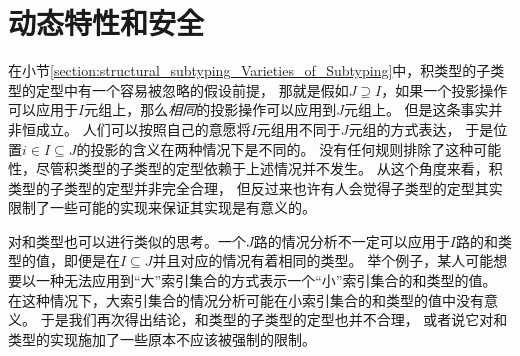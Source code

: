 \section{动态特性和安全}
在小节\ref{section:structural_subtyping_Varieties_of_Subtyping}中，积类型的子类型的定型中有一个容易被忽略的假设前提，
那就是假如$J\supseteq I$，如果一个投影操作可以应用于$I$元组上，那么\textit{相同}的投影操作可以应用到$J$元组上。
但是这条事实并非恒成立。
人们可以按照自己的意愿将$I$元组用不同于$J$元组的方式表达，
于是位置$i\in I \subseteq J$的投影的含义在两种情况下是不同的。
没有任何规则排除了这种可能性，尽管积类型的子类型的定型依赖于上述情况并不发生。
从这个角度来看，积类型的子类型的定型并非完全合理，
但反过来也许有人会觉得子类型的定型其实限制了一些可能的实现来保证其实现是有意义的。

对和类型也可以进行类似的思考。一个$J$路的情况分析不一定可以应用于$I$路的和类型的值，即便是在$I\subseteq J$并且对应的情况有着相同的类型。
举个例子，某人可能想要以一种无法应用到“大”索引集合的方式表示一个“小”索引集合的和类型的值。
在这种情况下，大索引集合的情况分析可能在小索引集合的和类型的值中没有意义。
于是我们再次得出结论，和类型的子类型的定型也并不合理，
或者说它对和类型的实现施加了一些原本不应该被强制的限制。

